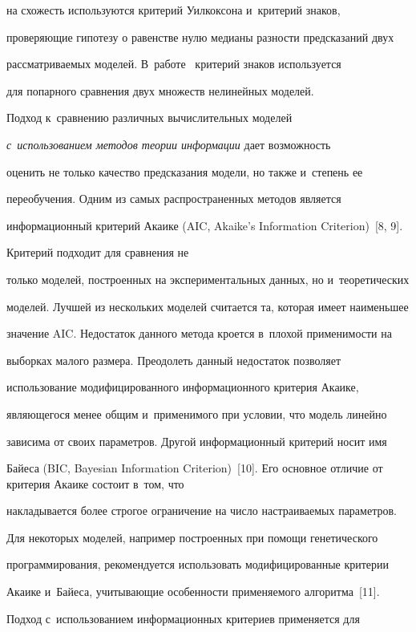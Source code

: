 на схожесть используются критерий Уилкоксона и~критерий знаков, 

проверяющие гипотезу о равенстве нулю медианы разности предсказаний двух 

рассматриваемых моделей. В~работе~\cite{3-tir} критерий знаков используется 

для попарного сравнения двух множеств нелинейных моделей. 

      

     Подход к~сравнению различных вычислительных моделей 

\textit{с~использованием методов теории информации} дает возможность 

оценить не только качество предсказания модели, но также и~степень ее 

переобучения. Одним из самых распространенных методов является 

информационный критерий Акаике (AIC, Akaike's Information Criterion)~[8, 9]. 

Критерий подходит для сравнения не 

только моделей, построенных на экспериментальных данных, но и~теоретических 

моделей. Лучшей из нескольких моделей считается та, которая имеет наименьшее 

значение AIC. Недостаток данного метода кроется в~плохой применимости на 

выборках малого размера. Преодолеть данный недостаток позволяет 

использование модифицированного информационного критерия Акаике, 

являющегося менее общим и~применимого при условии, что модель линейно 

зависима от своих параметров. Другой информационный критерий носит имя 

Байеса (BIC, Bayesian Information Criterion)~[10]. Его основное отличие от критерия Акаике состоит в~том, что 

накладывается более строгое ограничение на число настраиваемых параметров. 

Для некоторых моделей, например построенных при помощи генетического 

программирования, рекомендуется использовать модифицированные критерии 

Акаике и~Байеса, учитывающие особенности применяемого алгоритма~[11]. 

Подход с~использованием информационных критериев применяется для 

